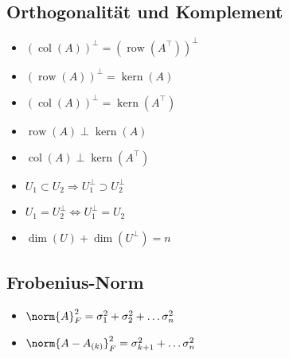 \documentclass[german, 6pt]{latex4ei/latex4ei_sheet}
\DeclareMathOperator{\col}{col}
\DeclareMathOperator{\row}{row}
\DeclareMathOperator{\Kern}{kern}
\begin{document}
\subsection{Orthogonalität und Komplement}
\begin{itemize}
	\item $(\col(A))^\perp=(\row(A^\top ))^\perp$
	\item $(\row(A))^\perp = \Kern(A)$
	\item $(\col(A))^\perp = \Kern(A^\top)$
	\item $\row(A) \perp \Kern(A)$
	\item $\col(A) \perp \Kern(A^\top)$
	\item $U_1 \subset U_2 \Rightarrow U_1^\perp \supset U_2^\perp$
	\item $U_1=U_2^\perp \Leftrightarrow U_1^\perp =U_2$
	\item $\dim(U) + \dim(U^\perp )=n$
\end{itemize}
\subsection{Frobenius-Norm}
\begin{itemize}
	\item $\norm{A}_F^2=\sigma_1^2+\sigma_2^2+\dots \sigma_n^2$
	\item $\norm{A-A_{(k)}}_F^2=\sigma_{k+1}^2+\dots \sigma_n^2$
\end{itemize}



\end{document}
